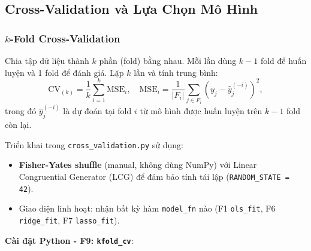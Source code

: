 \subsection{Cross-Validation và Lựa Chọn Mô Hình}

\subsubsection{$k$-Fold Cross-Validation}

\begin{tcolorbox}[mycodebox, colback=blue!3!white, colframe=blue!40!black,
    title={\textbf{Định nghĩa 1.5} - $k$-Fold Cross-Validation}]
Chia tập dữ liệu thành $k$ phần (fold) bằng nhau. Mỗi lần dùng $k-1$
fold để huấn luyện và 1 fold để đánh giá. Lặp $k$ lần và tính trung bình:
\begin{equation}
    \mathrm{CV}_{(k)} = \frac{1}{k}\sum_{i=1}^{k} \mathrm{MSE}_i,
    \quad
    \mathrm{MSE}_i = \frac{1}{|F_i|}\sum_{j \in F_i}(y_j - \hat{y}_j^{(-i)})^2,
    \label{eq:cv}
\end{equation}
trong đó $\hat{y}_j^{(-i)}$ là dự đoán tại fold $i$ từ mô hình được huấn
luyện trên $k-1$ fold còn lại.
\end{tcolorbox}

Triển khai trong \texttt{cross\_validation.py} sử dụng:
\begin{itemize}
    \item \textbf{Fisher-Yates shuffle} (manual, không dùng NumPy) với
          Linear Congruential Generator (LCG) để đảm bảo tính tái lập
          (\texttt{RANDOM\_STATE = 42}).
    \item Giao diện linh hoạt: nhận bất kỳ hàm \texttt{model\_fn} nào
          (F1 \texttt{ols\_fit}, F6 \texttt{ridge\_fit}, F7 \texttt{lasso\_fit}).
\end{itemize}

\textbf{Cài đặt Python - F9: \texttt{kfold\_cv}}:

